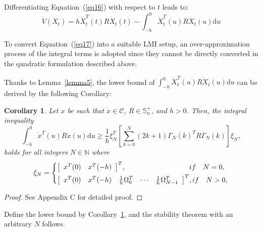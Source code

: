 \documentclass[a4paper]{cas-sc}
\newtheorem*{proof}{Proof}
\newtheorem{corollary}[theorem]{Corollary}
\begin{document}
Differentiating Equation~(\ref{eq16}) with respect to $t$ leads to:
\begin{equation}
  \dot V\left( {{X_t}} \right) = h\dot X_t^T(t)R{\dot X_t}(t) - \int_{ - h}^0 {\dot X_t^T} (u)R{\dot X_t}(u){\text{d}}u
  \label{eq17}
\end{equation}

To convert Equation~(\ref{eq17}) into a suitable LMI setup, an over-approximation process of the integral terms is adopted since they cannot be directly converted in the quadratic formulation described above.

Thanks to Lemma~\ref{lemma5}, the lower bound of $\int_{ - h}^0 {\dot X_t^T} (u)R{\dot X_t}(u){\text{d}}u$ can be derived by the following Corollary:
\begin{corollary}
  \label{corollary9}
  Let $x$ be such that $\dot x \in \mathcal{C}$, $R \in \mathbb{S}_n^ + $, and $h > 0$. Then, the integral inequality
  \begin{equation}
    \int_{ - h}^0 {{{\dot x}^T}} (u)R\dot x(u){\text{d}}u \geqslant \frac{1}{h}\xi _N^T\left[ {\sum\limits_{k = 0}^N {(2k + 1)} {\Gamma _N}{{(k)}^T}R{\Gamma _N}(k)} \right]{\xi _N},
    \label{eq18}
  \end{equation}
  holds for all integers $N \in \mathbb{N}$ where
  \begin{equation}
    {\xi _N} = \left\{ \begin{gathered}
      {\left[ {\begin{array}{*{20}{c}}
                {{x^T}(0)} & {{x^T}( - h)}
              \end{array}} \right]^T},\quad \quad \quad \quad \quad \quad \quad \quad \quad if\quad N = 0, \hfill \\
      {\left[ {\begin{array}{*{20}{c}}
              {{x^T}(0)} & {{x^T}( - h)} & {\frac{1}{h}\Omega _0^T} & \cdots & {\frac{1}{h}\Omega _{N - 1}^T}
            \end{array}} \right]^T},if\quad N > 0, \hfill \\
    \end{gathered}  \right.
    \label{eq19}
  \end{equation}
\end{corollary}
\begin{proof}
  See Appendix C for detailed proof.
\end{proof}

Define the lower bound by Corollary~\ref{corollary9}, and the stability theorem with an arbitrary $N$ follows.
\end{document}
